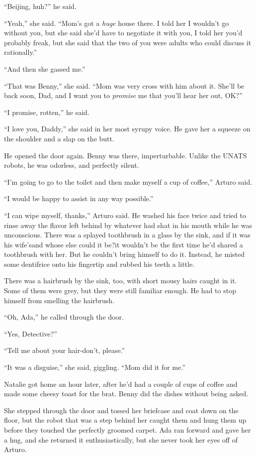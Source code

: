 “Beijing, huh?” he said.

“Yeah,” she said. “Mom’s got a \emph{huge} house there. I told her
I wouldn’t go without you, but she said she’d have to negotiate it
with you, I told her you’d probably freak, but she said that the
two of you were adults who could discuss it rationally.”

“And then she gassed me.”

“That was Benny,” she said. “Mom was very cross with him about it.
She’ll be back soon, Dad, and I want you to \emph{promise} me that
you’ll hear her out, OK?”

“I promise, rotten,” he said.

“I love you, Daddy,” she said in her most syrupy voice. He gave her
a squeeze on the shoulder and a slap on the butt.

He opened the door again. Benny was there, imperturbable. Unlike
the UNATS robots, he was odorless, and perfectly silent.

“I’m going to go to the toilet and then make myself a cup of
coffee,” Arturo said.

“I would be happy to assist in any way possible.”

“I can wipe myself, thanks,” Arturo said. He washed his face twice
and tried to rinse away the flavor left behind by whatever had shat
in his mouth while he was unconscious. There was a splayed
toothbrush in a glass by the sink, and if it was his wife’s{\dash}and
whose else could it be?{\dash}it wouldn’t be the first time he’d shared a
toothbrush with her. But he couldn’t bring himself to do it.
Instead, he misted some dentifrice onto his fingertip and rubbed
his teeth a little.

There was a hairbrush by the sink, too, with short mousy hairs
caught in it. Some of them were grey, but they were still familiar
enough. He had to stop himself from smelling the hairbrush.

“Oh, Ada,” he called through the door.

“Yes, Detective?”

“Tell me about your hair-don’t, please.”

“It was a disguise,” she said, giggling. “Mom did it for me.”

\tb

Natalie got home an hour later, after he’d had a couple of cups of
coffee and made some cheesy toast for the brat. Benny did the
dishes without being asked.

She stepped through the door and tossed her briefcase and coat down
on the floor, but the robot that was a step behind her caught them
and hung them up before they touched the perfectly groomed carpet.
Ada ran forward and gave her a hug, and she returned it
enthusiastically, but she never took her eyes off of Arturo.

